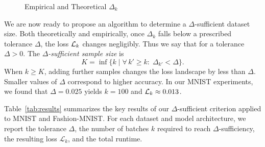\documentclass{article}
\begin{document}
\begin{figure}[!htbp]
  \caption{Empirical and Theoretical $\Delta_k$}
  \label{fig:delta_loss}
\end{figure}

We are now ready to propose an algorithm to determine a $\Delta$-sufficient dataset size. Both theoretically and empirically, once
$\Delta_k$ falls below a prescribed tolerance $\Delta$, the loss $\mathcal{L}_k$ changes negligibly. Thus we say that
for a tolerance $\Delta > 0$. The \emph{$\Delta$-sufficient sample size} is
$$
  K =
  \inf \{ k \mid \forall\, k' \ge k : \; \Delta_{k'} < \Delta\}.
$$
When $k \ge K$, adding further samples changes the loss landscape by less than $\Delta$.
Smaller values of $\Delta$ correspond to higher accuracy. In our MNIST experiments, we found that
$\Delta=0.025$ yields $k=100$ and $\mathcal{L}_k\approx0.013$.

Table~\ref{tab:results} summarizes the key results of our $\Delta$-sufficient criterion applied to MNIST and Fashion-MNIST.
For each dataset and model architecture, we report the tolerance $\Delta$, the number of batches $k$ required to reach
$\Delta$-sufficiency, the resulting loss $\mathcal{L}_k$, and the total runtime.
\end{document}
